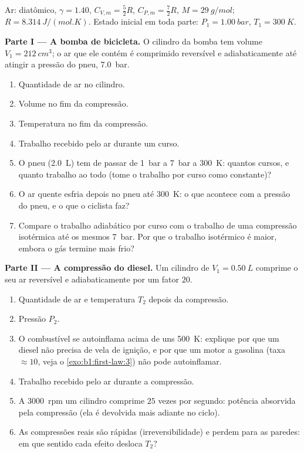 \begin{problem}
\label{pb:b1:first-law:1}
Ar:  diatômico, $\gamma = 1.40$, $C_{V,m} = \tfrac52 R$, $C_{P,m} =
\tfrac72 R$, $M = \qty{29}{g/mol}$; $R = \qty{8.314}{J/(mol.K)}$. Estado
inicial em toda parte: $P_1 = \qty{1.00}{bar}$, $T_1 = \qty{300}{K}$.

\medskip
\noindent\textbf{Parte I --- A bomba de bicicleta.}
O cilindro da bomba tem volume $V_1 = \qty{212}{cm^3}$; o ar que ele contém
é comprimido reversível e adiabaticamente até atingir a pressão do pneu,
\qty{7.0}{bar}.
\begin{enumerate}
  \item Quantidade de ar no cilindro.
  \item Volume no fim da compressão.
  \item Temperatura no fim da compressão.
  \item Trabalho recebido pelo ar durante um curso.
  \item O pneu (\qty{2.0}{L}) tem de passar de \qty{1}{bar} a
        \qty{7}{bar} a \qty{300}{K}: quantos cursos, e quanto trabalho
        ao todo (tome o trabalho por curso como constante)?
  \item O ar quente esfria depois no pneu até \qty{300}{K}: o que acontece
        com a pressão do pneu, e o que o ciclista faz?
  \item Compare o trabalho adiabático por curso com o trabalho de uma
        compressão isotérmica até os mesmos \qty{7}{bar}. Por que o
        trabalho isotérmico é maior, embora o gás termine mais frio?
\end{enumerate}

\medskip
\noindent\textbf{Parte II --- A compressão do diesel.}
Um cilindro de $V_1 = \qty{0.50}{L}$ comprime o seu ar reversível e
adiabaticamente por um fator $20$.
\begin{enumerate}[resume]
  \item Quantidade de ar e temperatura $T_2$ depois da compressão.
  \item Pressão $P_2$.
  \item O combustível se autoinflama acima de uns \qty{500}{K}: explique
        por que um diesel não precisa de vela de ignição, e por que um
        motor a gasolina (taxa $\approx 10$, veja o
        \cref{exo:b1:first-law:3}) não pode autoinflamar.
  \item Trabalho recebido pelo ar durante a compressão.
  \item A \qty{3000}{rpm} um cilindro comprime $25$ vezes por segundo:
        potência absorvida pela compressão (ela é devolvida mais adiante
        no ciclo).
  \item As compressões reais são rápidas (irreversibilidade) e perdem
         para as paredes: em que sentido cada efeito desloca $T_2$?
\end{enumerate}


\end{problem}
